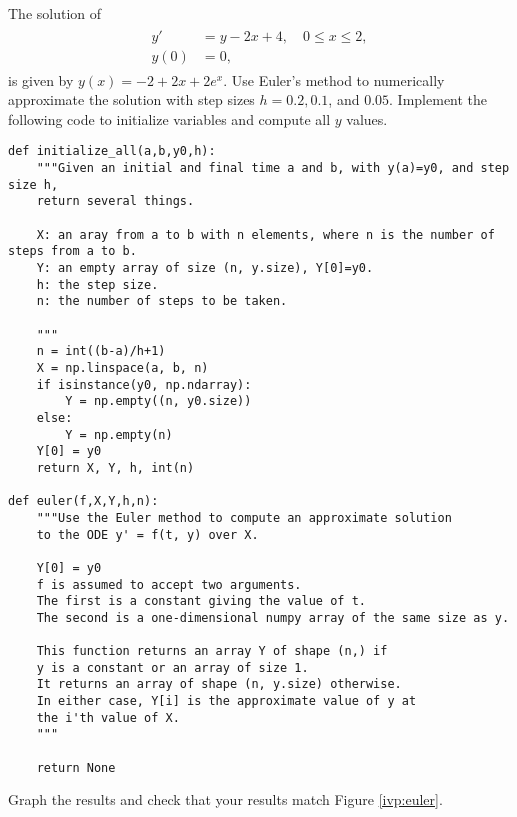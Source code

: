  The solution of
\begin{align}
	\begin{split}
		y' &= y - 2x + 4,\quad 0 \leq x \leq 2, \\
		y(0) &= 0,
	\end{split}\label{ivp:prob1}
\end{align}
is given by $y(x) = -2+2x + 2e^x.$
Use Euler's method to numerically approximate the solution with step sizes $h = 0.2, 0.1$, and $0.05.$ 
Implement the following code to initialize variables and compute all $y$ values.

\begin{lstlisting}
def initialize_all(a,b,y0,h):
    """Given an initial and final time a and b, with y(a)=y0, and step size h,
    return several things.
    
    X: an aray from a to b with n elements, where n is the number of steps from a to b.
    Y: an empty array of size (n, y.size), Y[0]=y0.
    h: the step size.
    n: the number of steps to be taken.
    
    """
    n = int((b-a)/h+1)
    X = np.linspace(a, b, n)
    if isinstance(y0, np.ndarray):
        Y = np.empty((n, y0.size))
    else:
        Y = np.empty(n)
    Y[0] = y0
    return X, Y, h, int(n)

def euler(f,X,Y,h,n):
    """Use the Euler method to compute an approximate solution
    to the ODE y' = f(t, y) over X.

    Y[0] = y0
    f is assumed to accept two arguments.
    The first is a constant giving the value of t.
    The second is a one-dimensional numpy array of the same size as y.

    This function returns an array Y of shape (n,) if
    y is a constant or an array of size 1.
    It returns an array of shape (n, y.size) otherwise.
    In either case, Y[i] is the approximate value of y at
    the i'th value of X.
    """
    
    return None
\end{lstlisting}

Graph the results and check that your results match Figure \ref{ivp:euler}.

